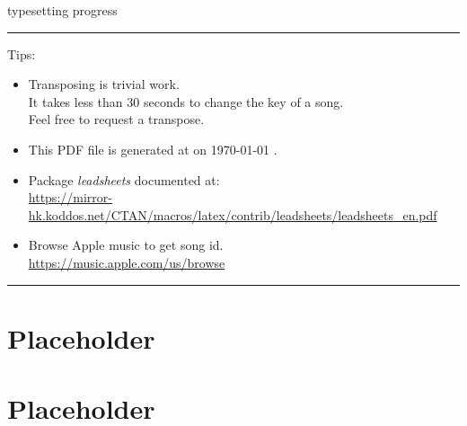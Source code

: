 \documentclass{article}
\begin{document}



\par
{\ttfamily typesetting progress} \par
\bigskip



\label{lbtoc}
\newcommand{\cursec}[0]{}
\tableofcontents
\bigskip
\hrule
\bigskip
Tips:
\begin{itemize}
  \item Transposing is trivial work. \\ It takes less than 30 seconds to change the key of a song. \\ Feel free to request a transpose.
  \item This PDF file is generated at \textbraceleft{} \currenttime{} \textbraceright{} on \textbraceleft{} \today{} \textbraceright{}.
  \item Package \textit{leadsheets} documented at: \\ \url{https://mirror-hk.koddos.net/CTAN/macros/latex/contrib/leadsheets/leadsheets_en.pdf}
  \item Browse Apple music to get song id. \\ \url{https://music.apple.com/us/browse}
\end{itemize}
\hrule

\pagebreak

\section{Placeholder} \pagebreak
\section{Placeholder} \pagebreak
\end{document}
